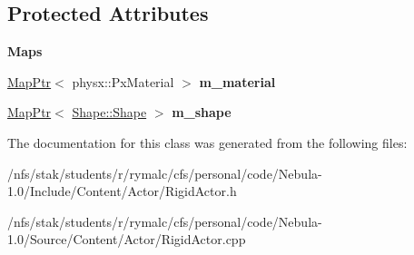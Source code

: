 \subsection*{Protected Attributes}
\begin{Indent}{\bf Maps}\par
{\em \label{_amgrpaf51fdf94adbb4b6fe4f1275b07df10d}
 }\begin{DoxyCompactItemize}
\item 
\hypertarget{classContent_1_1RigidActor_a3a111ad05b8e4167b990ac1562434d3c}{
\hyperlink{classMapPtr}{MapPtr}$<$ physx::PxMaterial $>$ {\bfseries m\_\-material}}
\label{classContent_1_1RigidActor_a3a111ad05b8e4167b990ac1562434d3c}

\item 
\hypertarget{classContent_1_1RigidActor_ab1e603eaf34105967b6caa018a92f809}{
\hyperlink{classMapPtr}{MapPtr}$<$ \hyperlink{classContent_1_1Shape_1_1Shape}{Shape::Shape} $>$ {\bfseries m\_\-shape}}
\label{classContent_1_1RigidActor_ab1e603eaf34105967b6caa018a92f809}

\end{DoxyCompactItemize}
\end{Indent}


The documentation for this class was generated from the following files:\begin{DoxyCompactItemize}
\item 
/nfs/stak/students/r/rymalc/cfs/personal/code/Nebula-\/1.0/Include/Content/Actor/RigidActor.h\item 
/nfs/stak/students/r/rymalc/cfs/personal/code/Nebula-\/1.0/Source/Content/Actor/RigidActor.cpp\end{DoxyCompactItemize}
